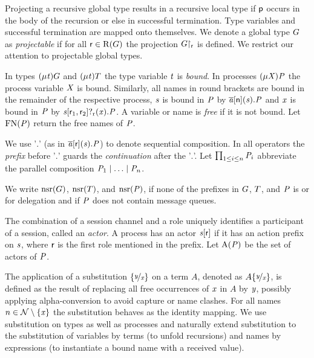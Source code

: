 Projecting a recursive global type results in a recursive local type if $ \Role[p] $ occurs in the body of the recursion or else in successful termination.
Type variables and successful termination are mapped onto themselves.
We denote a global type $ \GT $ as \emph{projectable} if for all $ \Role \in \Roles{\GT} $ the projection $ \Proj{\GT}{\Role} $ is defined.
We restrict our attention to projectable global types.

In types $ \GRep{\TypeV}{\GT} $ and $ \LRep{\TypeV}{\LT} $ the type variable $ \TypeV $ is \emph{bound}.
In processes $ \PRep{\ProcV}{\PT} $ the process variable $ \ProcV $ is bound.
Similarly, all names in round brackets are bound in the remainder of the respective process, \eg $ \Chan $ is bound in $ \PT $ by $ \PReq{\Chan[a]}{\Role[n]}{\Chan}{\PT} $ and $ \Args $ is bound in $ \PT $ by $ \PGetR{\Chan}{\Role_1}{\Role_2}{\Args}{\PT} $.
A variable or name is \emph{free} if it is not bound. Let $ \FreeNames{\PT} $ return the free names of $ \PT $.

We use '$. $' (as \eg in $ \PReq{\Chan[a]}{\Role}{\Chan}{\PT} $) to denote sequential composition. In all operators the \emph{prefix} before '$. $' guards the \emph{continuation} after the '$. $'.
Let $ \prod_{1 \leq i \leq n} \PT_i $ abbreviate the parallel composition $ \PPar{\PT_1}{\PPar{\ldots}{\PT_n}} $.

We write  $ \Unreliable{\GT} $, $ \Unreliable{\LT} $, and $ \Unreliable{\PT} $, if none of the prefixes in $ \GT $, $ \LT $, and $ \PT $ is \strongR or for delegation and if $ \PT $ does not contain message queues.

The combination of a session channel and a role uniquely identifies a participant of a session, called an \emph{actor}. A process has an actor $ \AT{\Chan[s]}{\Role} $ if it has an action prefix on $ \Chan $, where $ \Role $ is the first role mentioned in the prefix.
Let $ \Actors{\PT} $ be the set of actors of $ \PT $.


The application of a substitution $ \Subst{\Args[y]}{\Args} $ on a term $ A $, denoted as $ A\Subst{\Args[y]}{\Args} $, is defined as the result of replacing all free occurrences of $ \Args $ in $ A $ by $ \Args[y] $, possibly applying alpha-conversion to avoid capture or name clashes. For all names $ n \in \names \setminus \Set{ \Args } $ the substitution behaves as the identity mapping. We use substitution on types as well as processes and naturally extend substitution to the substitution of variables by terms (to unfold recursions) and names by expressions (to instantiate a bound name with a received value).

